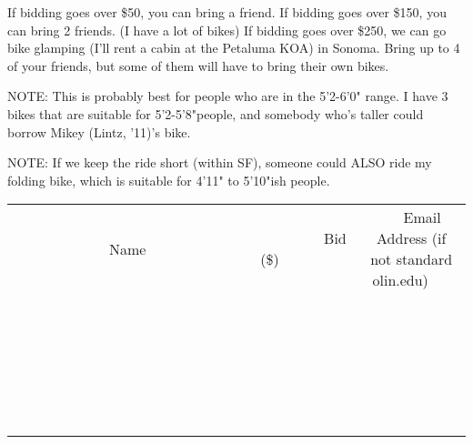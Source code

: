 \documentclass[11pt]{article}
\begin{document}
If bidding goes over \$50, you can bring a friend. 
If bidding goes over \$150, you can bring 2 friends. (I have a lot of bikes)
If bidding goes over \$250, we can go bike glamping (I'll rent a cabin at the Petaluma KOA) in Sonoma. Bring up to 4 of your friends, but some of them will have to bring their own bikes.

NOTE: This is probably best for people who are in the 5'2-6'0" range. I have 3 bikes that are suitable for 5'2-5'8"people, and somebody who's taller could borrow Mikey (Lintz, '11)'s bike. 

NOTE: If we keep the ride short (within SF), someone could ALSO ride my folding bike, which is suitable for 4'11" to 5'10"ish people.
\\[6ex]
\begin{tabular}{c c c}
~~~~~~~~~~~~~Name~~~~~~~~~~~~~ & ~~~~~~~~~Bid (\$)~~~~~~~~~  & ~~~Email Address (if not standard olin.edu)~~~\\
 & & \\
\hline
 & & \\
\hline
 & & \\
\hline
 & & \\
\hline
 & & \\
\hline
 & & \\
\hline
 & & \\
\hline
 & & \\
\hline
 & & \\
\hline
 & & \\
\hline
 & & \\
\hline
 & & \\
\hline
 & & \\
\hline
 & & \\
\hline
 & & \\
\hline
 & & \\
\hline
 & & \\
\hline
 & & \\
\hline
 & & \\
\hline
 & & \\
\hline
 & & \\
\hline
 & & \\
\hline
 & & \\
\hline
 & & \\
\hline
 & & \\
\hline
 & & \\
\hline
\end{tabular}
\newpage
\end{document}
